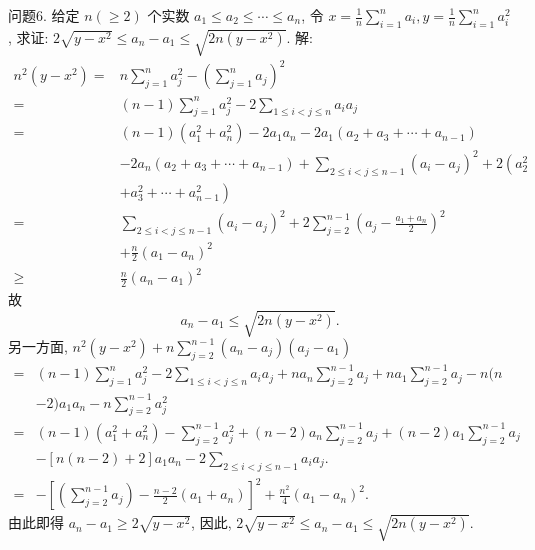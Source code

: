 问题6. 给定 $n(\geqslant 2)$ 个实数 $a_1 \leqslant a_2 \leqslant \cdots \leqslant a_n$, 令 $x=\frac{1}{n} \sum_{i=1}^n a_i, y=\frac{1}{n} \sum_{i=1}^n a_i^2$, 求证: $2 \sqrt{y-x^2} \leqslant a_n-a_1 \leqslant \sqrt{2 n\left(y-x^2\right)}$.
解:$$
\begin{aligned}
n^2\left(y-x^2\right)= & n \sum_{j=1}^n a_j^2-\left(\sum_{j=1}^n a_j\right)^2 \\
= & (n-1) \sum_{j=1}^n a_j^2-2 \sum_{1 \leqslant i<j \leqslant n} a_i a_j \\
= & (n-1)\left(a_1^2+a_n^2\right)-2 a_1 a_n-2 a_1\left(a_2+a_3+\cdots+a_{n-1}\right) \\
& -2 a_n\left(a_2+a_3+\cdots+a_{n-1}\right)+\sum_{2 \leqslant i<j \leqslant n-1}\left(a_i-a_j\right)^2+2\left(a_2^2\right. \\
& \left.+a_3^2+\cdots+a_{n-1}^2\right) \\
= & \sum_{2 \leqslant i<j \leqslant n-1}\left(a_i-a_j\right)^2+2 \sum_{j=2}^{n-1}\left(a_j-\frac{a_1+a_n}{2}\right)^2 \\
& +\frac{n}{2}\left(a_1-a_n\right)^2 \\
\geqslant & \frac{n}{2}\left(a_n-a_1\right)^2
\end{aligned}
$$
故
$$
a_n-a_1 \leqslant \sqrt{2 n\left(y-x^2\right)} .
$$
另一方面, $n^2\left(y-x^2\right)+n \sum_{j=2}^{n-1}\left(a_n-a_j\right)\left(a_j-a_1\right)$
$$
\begin{aligned}
= & (n-1) \sum_{j=1}^n a_j^2-2 \sum_{1 \leqslant i<j \leqslant n} a_i a_j+n a_n \sum_{j=2}^{n-1} a_j+n a_1 \sum_{j=2}^{n-1} a_j-n(n \\
& -2) a_1 a_n-n \sum_{j=2}^{n-1} a_j^2 \\
= & (n-1)\left(a_1^2+a_n^2\right)-\sum_{j=2}^{n-1} a_j^2+(n-2) a_n \sum_{j=2}^{n-1} a_j+(n-2) a_1 \sum_{j=2}^{n-1} a_j \\
& -[n(n-2)+2] a_1 a_n-2 \sum_{2 \leqslant i<j \leqslant n-1} a_i a_j . \\
= & -\left[\left(\sum_{j=2}^{n-1} a_j\right)-\frac{n-2}{2}\left(a_1+a_n\right)\right]^2+\frac{n^2}{4}\left(a_1-a_n\right)^2 .
\end{aligned}
$$
由此即得 $a_n-a_1 \geqslant 2 \sqrt{y-x^2}$,
因此, $2 \sqrt{y-x^2} \leqslant a_n-a_1 \leqslant \sqrt{2 n\left(y-x^2\right)}$.



